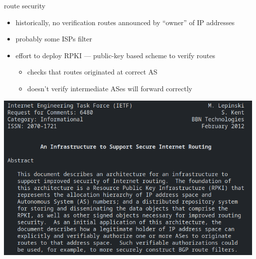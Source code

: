 \begin{frame}{route security}
    \begin{itemize}
    \item historically, no verification routes announced by ``owner'' of IP addresses
    \vspace{.5cm}
    \item probably some ISPs filter
    \item effort to deploy RPKI --- public-key based scheme to verify routes
        \begin{itemize}
        \item checks that routes originated at correct AS
        \item doesn't verify intermediate ASes will forward correctly
        \end{itemize}
    \end{itemize}
\end{frame}

\begin{frame}{}
\includegraphics[height=\textheight]{../routing/rpki-rfc}
\end{frame}
